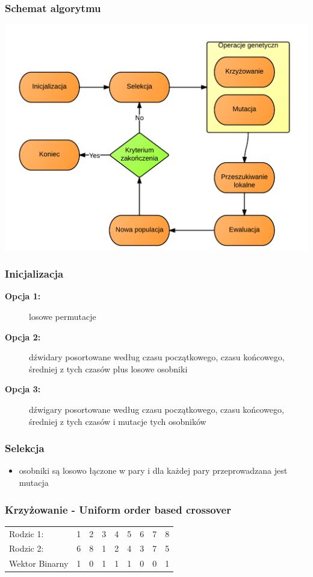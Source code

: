 \documentclass{beamer}
\begin{document}
\begin{frame}
 \frametitle{Schemat algorytmu}
 \begin{center}
 \includegraphics[scale=0.18]{./Grafika/schemat.png}
\end{center}

\end{frame}

\begin{frame}
 \frametitle{Inicjalizacja}
 \begin{description}
  \item[\textbf{Opcja 1:}] losowe permutacje
  \item[\textbf{Opcja 2:}] dźwidary posortowane według czasu początkowego, czasu końcowego, średniej z tych czasów plus losowe osobniki
  \item[\textbf{Opcja 3:}]  dźwigary posortowane według czasu początkowego, czasu końcowego, średniej z tych czasów i mutacje tych osobników
  \end{description}
\end{frame}

\begin{frame}
 \frametitle{Selekcja}
 \begin{itemize}
  \item osobniki są losowo łączone w pary i dla każdej pary przeprowadzana jest mutacja
 \end{itemize}

\end{frame}

\begin{frame}
 \frametitle{Krzyżowanie - Uniform order based crossover}
\begin{center}
\begin{tabular}{lllllllll}
Rodzic 1: & 1 & 2 & 3 & 4 & 5 & 6 & 7 & 8\\
Rodzic 2: & 6 & 8 & 1 & 2 & 4 & 3 & 7 & 5\\
Wektor Binarny & 1 & 0 & 1 & 1 & 1 & 0 & 0 & 1
\end{tabular}
\end{center}

 

\end{frame}
\end{document}
